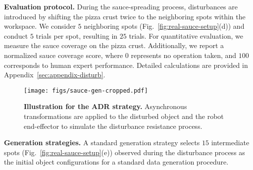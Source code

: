 \vspace{0.2cm} \noindent\textbf{Evaluation protocol.} During the sauce-spreading process, disturbances are introduced by shifting the pizza crust twice to the neighboring spots within the workspace. We consider $5$ neighboring spots (Fig.~\ref{fig:real-sauce-setup}(d)) and conduct $5$ trials per spot, resulting in $25$ trials.
For quantitative evaluation, we measure the sauce coverage on the pizza crust. Additionally, we report a normalized sauce coverage score, where $0$ represents no operation taken, and $100$ corresponds to human expert performance. Detailed calculations are provided in Appendix~\ref{sec:appendix-disturb}.





\begin{figure}
    \centering
    \texttt{[image: figs/sauce-gen-cropped.pdf]}
    \caption{\textbf{Illustration for the ADR strategy. } Asynchronous transformations are applied to the disturbed object and the robot end-effector to simulate the disturbance resistance process.}
    \label{fig:real-sauce-gen}
\end{figure}











\vspace{0.2cm} \noindent\textbf{Generation strategies.} A standard generation strategy selects $15$ intermediate spots (Fig.~\ref{fig:real-sauce-setup}(e)) observed during the disturbance process as the initial object configurations for a standard \method data generation procedure.

